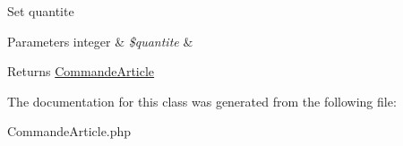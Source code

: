 Set quantite


\begin{DoxyParams}[1]{Parameters}
integer & {\em \$quantite} & \\
\hline
\end{DoxyParams}
\begin{DoxyReturn}{Returns}
\hyperlink{class_app_bundle_1_1_entity_1_1_commande_article}{Commande\+Article} 
\end{DoxyReturn}


The documentation for this class was generated from the following file\+:\begin{DoxyCompactItemize}
\item 
Commande\+Article.\+php\end{DoxyCompactItemize}

